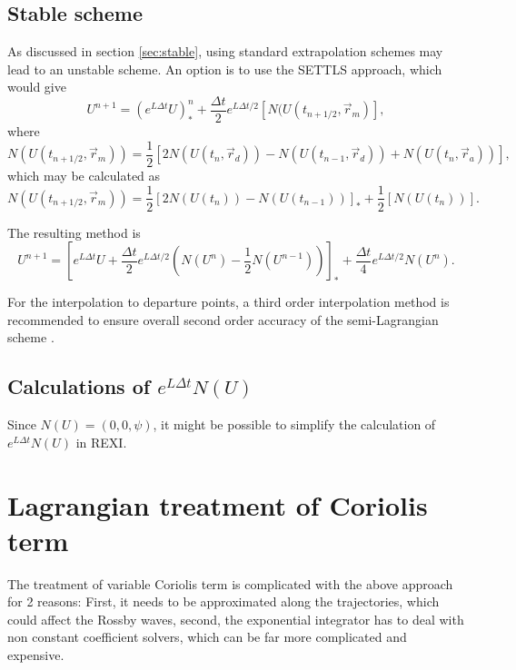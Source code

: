 \documentclass[10pt,a4paper]{article}
\begin{document}
\subsection{Stable scheme}


As discussed in section \ref{sec:stable}, using standard extrapolation schemes may lead to an unstable scheme. An option is to use the SETTLS approach, which would give
\begin{equation}
U^{n+1}=(e^{L \Delta t} U)^{n}_{*}+\frac{\Delta t}{2}e^{L\Delta t/2}\left[  N(U(t_{n+1/2}, \vec{r}_m)\right],
\end{equation}
where 
\begin{equation}
 N(U(t_{n+1/2}, \vec{r}_m)) = 
\frac{1}{2}\left[2 N(U(t_{n}, \vec{r}_d))- N(U(t_{n-1}, \vec{r}_d))+  N(U(t_{n}, \vec{r}_a))\right],
\end{equation}
which may be calculated as
\begin{equation}
 N(U(t_{n+1/2}, \vec{r}_m)) = 
\frac{1}{2}\left[ 2 N(U(t_{n}))- N(U(t_{n-1}))\right]_* +  \frac{1}{2}\left[N(U(t_{n}))\right].
\end{equation}


The resulting method is 
\begin{equation}
U^{n+1}=\left[e^{L \Delta t} U+\frac{\Delta t}{2}e^{L\Delta t/2}\left( N(U^n)- \frac{1}{2}N(U^{n-1})\right) \right]_*+\frac{\Delta t}{4}e^{L\Delta t/2}N(U^n).
\end{equation}


For the interpolation to departure points, a third order interpolation method is recommended to ensure overall second order accuracy of the semi-Lagrangian scheme \cite{Peixoto2014}.

\subsection{Calculations of $e^{L\Delta t}N(U)$ }

Since $N(U)=(0,0,\psi)$, it might be possible to simplify the calculation of $e^{L\Delta t}N(U)$ in REXI.

\section{Lagrangian treatment of Coriolis term}

The treatment of variable Coriolis term is complicated with the above approach for 2 reasons: First, it needs to be approximated along the trajectories, which could affect the Rossby waves, second, the exponential integrator has to deal with non constant coefficient solvers, which can be far more complicated and expensive.
\end{document}
